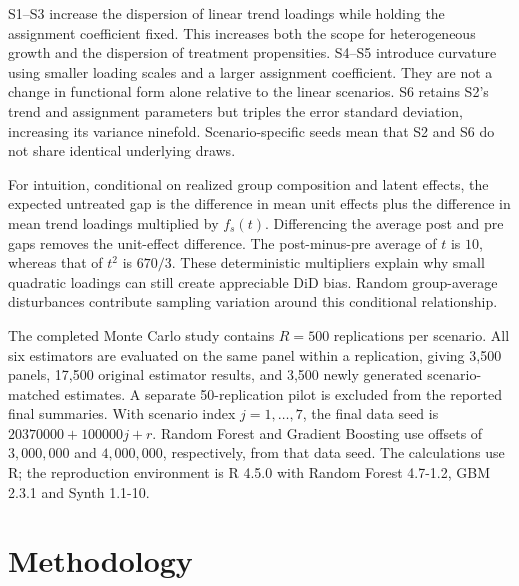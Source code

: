 \documentclass[11pt,a4paper]{article}
\begin{document}
S1--S3 increase the dispersion of linear trend loadings while holding the assignment coefficient fixed. This increases both the scope for heterogeneous growth and the dispersion of treatment propensities. S4--S5 introduce curvature using smaller loading scales and a larger assignment coefficient. They are not a change in functional form alone relative to the linear scenarios. S6 retains S2's trend and assignment parameters but triples the error standard deviation, increasing its variance ninefold. Scenario-specific seeds mean that S2 and S6 do not share identical underlying draws.

For intuition, conditional on realized group composition and latent effects, the expected untreated gap is the difference in mean unit effects plus the difference in mean trend loadings multiplied by $f_s(t)$. Differencing the average post and pre gaps removes the unit-effect difference. The post-minus-pre average of $t$ is $10$, whereas that of $t^2$ is $670/3$. These deterministic multipliers explain why small quadratic loadings can still create appreciable DiD bias. Random group-average disturbances contribute sampling variation around this conditional relationship.

The completed Monte Carlo study contains $R=500$ replications per scenario. All six estimators are evaluated on the same panel within a replication, giving 3,500 panels, 17,500 original estimator results, and 3,500 newly generated scenario-matched estimates. A separate 50-replication pilot is excluded from the reported final summaries. With scenario index $j=1,\ldots,7$, the final data seed is $20370000+100000j+r$. Random Forest and Gradient Boosting use offsets of $3{,}000{,}000$ and $4{,}000{,}000$, respectively, from that data seed. The calculations use R; the reproduction environment is R 4.5.0 with Random Forest 4.7-1.2, GBM 2.3.1 and Synth 1.1-10.

\section{Methodology}\label{sec:methodology}
\end{document}

